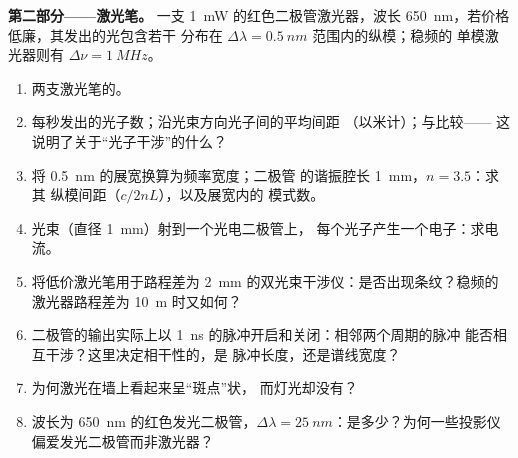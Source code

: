 \begin{problem}
\medskip
\noindent\textbf{第二部分——激光笔。}
一支 \qty{1}{mW} 的红色二极管激光器，波长 \qty{650}{nm}，若价格低廉，其发出的光包含若干
分布在 $\Delta\lambda = \qty{0.5}{nm}$ 范围内的纵模；稳频的
单模激光器则有 $\Delta\nu = \qty{1}{MHz}$。
\begin{enumerate}[resume]
  \item 两支激光笔的。
  \item 每秒发出的光子数；沿光束方向光子间的平均间距
        （以米计）；与比较——
        这说明了关于“光子干涉”的什么？
  \item 将 \qty{0.5}{nm} 的展宽换算为频率宽度；二极管
        的谐振腔长 \qty{1}{mm}，$n = 3.5$：求其
        纵模间距（$c/2nL$），以及展宽内的
        模式数。
  \item 光束（直径 \qty{1}{mm}）射到一个光电二极管上，
        每个光子产生一个电子：求电流。
  \item 将低价激光笔用于路程差为
        \qty{2}{mm} 的双光束干涉仪：是否出现条纹？稳频的
        激光器路程差为 \qty{10}{m} 时又如何？
  \item 二极管的输出实际上以
        \qty{1}{ns} 的脉冲开启和关闭：相邻两个周期的脉冲
        能否相互干涉？这里决定相干性的，是
        脉冲长度，还是谱线宽度？
  \item 为何激光在墙上看起来呈“斑点”状，
        而灯光却没有？
  \item 波长为 \qty{650}{nm} 的红色发光二极管，$\Delta\lambda = \qty{25}{nm}$：是多少？为何一些投影仪偏爱发光二极管而非激光器？
\end{enumerate}


\end{problem}
